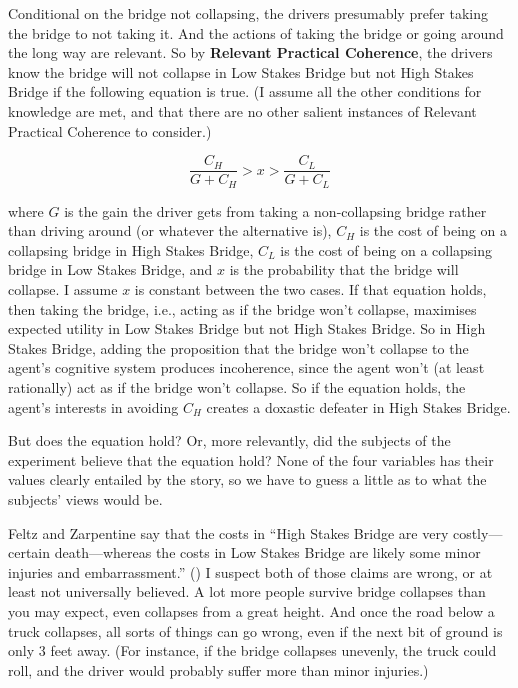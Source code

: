 \documentclass[
  11pt,
  letterpaper,
  DIV=11,
  numbers=noendperiod,
  oneside]{scrartcl}
\begin{document}
Conditional on the bridge not collapsing, the drivers presumably prefer
taking the bridge to not taking it. And the actions of taking the bridge
or going around the long way are relevant. So by \textbf{Relevant
Practical Coherence}, the drivers know the bridge will not collapse in
Low Stakes Bridge but not High Stakes Bridge if the following equation
is true. (I assume all the other conditions for knowledge are met, and
that there are no other salient instances of Relevant Practical
Coherence to consider.)

\[\frac{C_H}{G + C_H} > x > \frac{C_L}{G + C_L}\]

where \(G\) is the gain the driver gets from taking a non-collapsing
bridge rather than driving around (or whatever the alternative is),
\(C_H\) is the cost of being on a collapsing bridge in High Stakes
Bridge, \(C_L\) is the cost of being on a collapsing bridge in Low
Stakes Bridge, and \(x\) is the probability that the bridge will
collapse. I assume \(x\) is constant between the two cases. If that
equation holds, then taking the bridge, i.e., acting as if the bridge
won't collapse, maximises expected utility in Low Stakes Bridge but not
High Stakes Bridge. So in High Stakes Bridge, adding the proposition
that the bridge won't collapse to the agent's cognitive system produces
incoherence, since the agent won't (at least rationally) act as if the
bridge won't collapse. So if the equation holds, the agent's interests
in avoiding \(C_H\) creates a doxastic defeater in High Stakes Bridge.

But does the equation hold? Or, more relevantly, did the subjects of the
experiment believe that the equation hold? None of the four variables
has their values clearly entailed by the story, so we have to guess a
little as to what the subjects' views would be.

Feltz and Zarpentine say that the costs in ``High Stakes Bridge are very
costly---certain death---whereas the costs in Low Stakes Bridge are
likely some minor injuries and embarrassment.''
() I
suspect both of those claims are wrong, or at least not universally
believed. A lot more people survive bridge collapses than you may
expect, even collapses from a great height. And
once the road below a truck collapses, all sorts of things can go wrong,
even if the next bit of ground is only 3 feet away. (For instance, if
the bridge collapses unevenly, the truck could roll, and the driver
would probably suffer more than minor injuries.)
\end{document}
